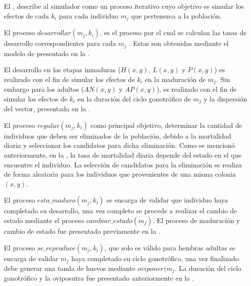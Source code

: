El , describe al simulador como un proceso iterativo cuyo objetivo
es simular los efectos de cada $k_{i}$ para cada individuo $m_{j}$ que pertenezca a la población.

El proceso $desarrollar(m_{j}, k_{i})$, es el proceso por el cual se calculan las tasas de
desarrollo correspondientes para cada $m_{j}$ . Estas son obtenidas mediante el modelo de
\cite{sharpe1977reaction} presentado en la .

El desarrollo en las etapas inmaduras ($H(x,y)$, $L(x,y)$ y $P(x,y)$) es realizado con el fin de
simular los efectos de $k_{i}$ en la maduración de $m_{j}$. Sin embargo para los adultos ($AN(x,y)$
y $AP(x,y)$), es realizado con el fin de simular los efectos de $k_{i}$ en la duración del ciclo
gonotrófico de $m_{j}$ y la dispersión del vector, presentada en la
.

El proceso $regular(m_{j}, k_{i})$ como principal objetivo, determinar la cantidad de individuos
que deben ser eliminados de la población, debido a la mortalidad diaria y seleccionar los
candidatos para dicha eliminación. Como se mencionó anteriormente, en la
, la tasa de mortalidad diaria depende del estado en el que
encuentre el individuo. La selección de candidatos para la eliminación se realiza de forma
aleatoria para los individuos que provenientes de una misma colonia $(x, y)$.

El proceso $esta\_maduro(m_{j}, k_{i})$ se encarga de validar que individuo haya completado su
desarrollo, una vez completo se procede a realizar el cambio de estado mediante el proceso
$cambiar\_estado(m_{j})$. El proceso de maduración y cambio de estado fue presentado previamente
en la .

El proceso $se\_reproduce(m_{j}, k_{i})$, que solo es válido para hembras adultas se encarga de
validar $m_{j}$ haya completado su ciclo gonotrófico, una vez finalizado debe generar una tanda de
huevos mediante $oviponer(m_{j}$. La duración del ciclo gonotrófico y la oviposutra fue presentado
anteriormente en la .

